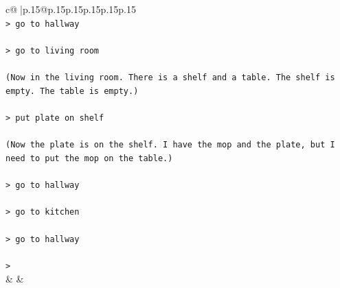 \documentclass{article}
\begin{document}
{\begin{supertabular}{c@{$\;$}|p{.15\linewidth}@{}p{.15\linewidth}p{.15\linewidth}p{.15\linewidth}p{.15\linewidth}p{.15\linewidth}}
{{{\\ 
\texttt{> go to hallway} \\
\\ 
\texttt{> go to living room} \\
\\ 
\texttt{(Now in the living room. There is a shelf and a table. The shelf is empty. The table is empty.)} \\
\\ 
\texttt{> put plate on shelf} \\
\\ 
\texttt{(Now the plate is on the shelf. I have the mop and the plate, but I need to put the mop on the table.)} \\
\\ 
\texttt{> go to hallway} \\
\\ 
\texttt{> go to kitchen} \\
\\ 
\texttt{> go to hallway} \\
\\ 
\texttt{>} \\
            }
        }
    }
    & & \\ \\


\end{supertabular}}
\end{document}
